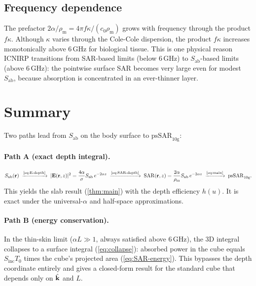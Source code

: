 \documentclass[11pt,a4paper]{article}
\theoremstyle{definition}
\theoremstyle{remark}
\newcommand{\Sab}{S_{\mathrm{ab}}}
\newcommand{\Sinc}{S_{\mathrm{inc}}}
\newcommand{\Tzero}{T_0}
\newcommand{\khat}{\hat{\vb{k}}}
\newcommand{\SAR}{\ensuremath{\mathrm{SAR}}}
\newcommand{\psSAR}{\ensuremath{\mathrm{psSAR}_{10\mathrm{g}}}}
\newcommand{\rhom}{\rho_{\mathrm{m}}}
\begin{document}
\subsection{Frequency dependence}

The prefactor $2\alpha/\rhom = 4\pi f\kappa/(c_0\rhom)$ grows with frequency
through the product $f\kappa$. Although $\kappa$ varies through the Cole-Cole
dispersion, the product $f\kappa$ increases monotonically above 6\,GHz for
biological tissue. This is one physical reason ICNIRP transitions from SAR-based
limits (below 6\,GHz) to $\Sab$-based limits (above 6\,GHz): the pointwise
surface SAR becomes very large even for modest $\Sab$, because absorption is
concentrated in an ever-thinner layer.




\section{Summary}
\label{sec:summary}

Two paths lead from $\Sab$ on the body surface to \psSAR:

\paragraph{Path A (exact depth integral).}
\begin{equation}\label{eq:chain}
  \Sab(\vb{r})
  \;\xrightarrow{\text{\cref{eq:E-depth}}}\;
  |\vb{E}(\vb{r},z)|^2 = \frac{4\alpha}{\sigma}\Sab\,e^{-2\alpha z}
  \;\xrightarrow{\text{\cref{eq:SAR-depth}}}\;
  \SAR(\vb{r},z) = \frac{2\alpha}{\rhom}\Sab\,e^{-2\alpha z}
  \;\xrightarrow{\text{\cref{eq:main}}}\;
  \psSAR.
\end{equation}
This yields the slab result (\cref{thm:main}) with the depth efficiency $h(u)$.
It is exact under the universal-$\alpha$ and half-space approximations.

\paragraph{Path B (energy conservation).}
In the thin-skin limit ($\alpha L \gg 1$, always satisfied above 6\,GHz), the
3D integral collapses to a surface integral
(\cref{eq:collapse}): absorbed power in the cube equals $\Sinc\Tzero$ times
the cube's projected area (\cref{eq:SAR-energy}).  This bypasses the
depth coordinate entirely and gives a closed-form result for the standard
cube that depends only on $\khat$ and $L$.
\end{document}
